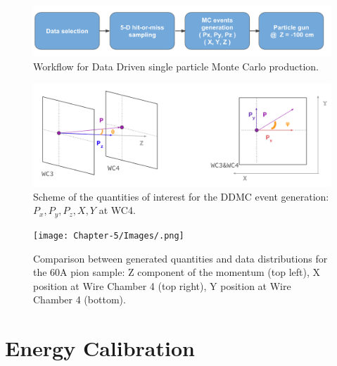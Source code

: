 \begin{figure}[hpbt]
\centering
\includegraphics[width=\textwidth]{Chapter-5/Images/DDMCScheme.png}
\caption{Workflow for Data Driven single particle Monte Carlo production.}
\label{fig:DDMCSketch}
\end{figure}


\begin{figure}[hpbt]
\centering
\includegraphics[width=\textwidth]{Chapter-5/Images/DDMCQuantities.png}
\caption{Scheme of the quantities of interest for the DDMC event generation: $P_x, P_y, P_z, X, Y$ at WC4.}
\label{fig:DDMCQuantities}
\end{figure}


\begin{figure}[hpbt]
\centering
\texttt{[image: Chapter-5/Images/.png]}
\caption{Comparison between generated quantities and data distributions for the 60A pion sample: Z component of the momentum (top left), X position at Wire Chamber 4 (top right), Y position at Wire Chamber 4 (bottom).}
\label{fig:DDMCComparison}
\end{figure}

\section{Energy Calibration}\label{ch:energyCalibration}
